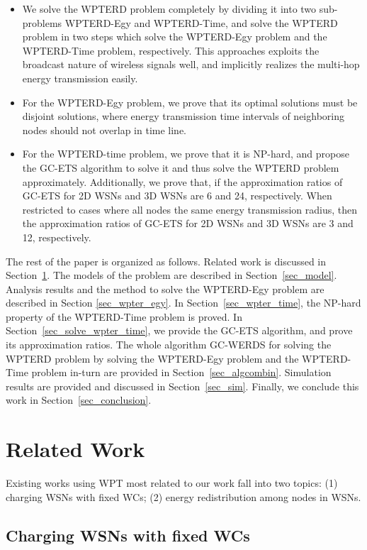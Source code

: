 \documentclass[journal,10pt]{IEEEtran}
\begin{document}
\begin{itemize}
\item{We solve the WPTERD problem completely by dividing it into two sub-problems WPTERD-Egy and WPTERD-Time, and solve the WPTERD problem in two steps which solve the WPTERD-Egy problem and the WPTERD-Time problem, respectively. This approaches exploits the broadcast nature of wireless signals well, and implicitly realizes the multi-hop energy transmission easily.}
\item{For the WPTERD-Egy problem, we prove that its optimal solutions must be disjoint solutions, where energy transmission time intervals of neighboring nodes should not overlap in time line.}
\item{For the WPTERD-time problem, we prove that it is NP-hard, and propose the GC-ETS algorithm to solve it and thus solve the WPTERD problem approximately. Additionally, we prove that, if the approximation ratios of GC-ETS for 2D WSNs and 3D WSNs are 6 and 24, respectively. When restricted to cases where all nodes the same energy transmission radius, then the approximation ratios of GC-ETS for 2D WSNs and 3D WSNs are 3 and 12, respectively.}
\end{itemize}

The rest of the paper is organized as follows. Related work is discussed in Section~\ref{sec_relwork}. The models of the problem are described in Section~\ref{sec_model}. Analysis results and the method to solve the WPTERD-Egy problem are described in Section \ref{sec_wpter_egy}. In Section~\ref{sec_wpter_time}, the NP-hard property of the WPTERD-Time problem is proved. In Section~\ref{sec_solve_wpter_time}, we provide the GC-ETS algorithm, and prove its approximation ratios. The whole algorithm GC-WERDS for solving the WPTERD problem by solving the WPTERD-Egy problem and the WPTERD-Time problem in-turn are provided in Section~\ref{sec_algcombin}. Simulation results are provided and discussed in Section~\ref{sec_sim}. Finally, we conclude this work in Section~\ref{sec_conclusion}.

\section{Related Work}
\label{sec_relwork}
Existing works using WPT most related to our work fall into two topics: (1) charging WSNs with fixed WCs; (2) energy redistribution among nodes in WSNs.

\subsection{Charging WSNs with fixed WCs}
\end{document}
